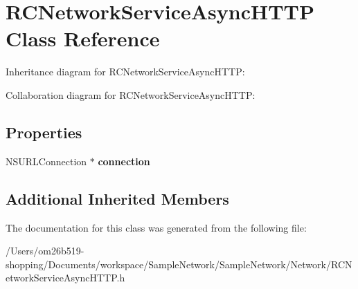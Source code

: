 \hypertarget{interface_r_c_network_service_async_h_t_t_p}{\section{R\-C\-Network\-Service\-Async\-H\-T\-T\-P Class Reference}
\label{interface_r_c_network_service_async_h_t_t_p}
}


Inheritance diagram for R\-C\-Network\-Service\-Async\-H\-T\-T\-P\-:


Collaboration diagram for R\-C\-Network\-Service\-Async\-H\-T\-T\-P\-:
\subsection*{Properties}
\begin{DoxyCompactItemize}
\item 
\hypertarget{interface_r_c_network_service_async_h_t_t_p_a5a25a0962f9166ae486f68281ad2705e}{N\-S\-U\-R\-L\-Connection $\ast$ {\bfseries connection}}\label{interface_r_c_network_service_async_h_t_t_p_a5a25a0962f9166ae486f68281ad2705e}

\end{DoxyCompactItemize}
\subsection*{Additional Inherited Members}


The documentation for this class was generated from the following file\-:\begin{DoxyCompactItemize}
\item 
/\-Users/om26b519-\/shopping/\-Documents/workspace/\-Sample\-Network/\-Sample\-Network/\-Network/R\-C\-Network\-Service\-Async\-H\-T\-T\-P.\-h\end{DoxyCompactItemize}
